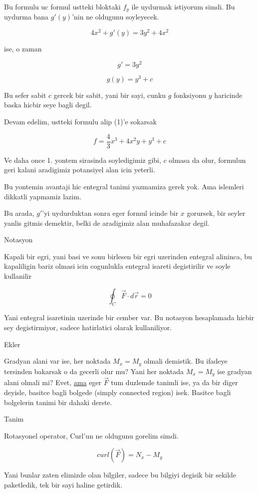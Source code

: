 \documentclass[12pt,fleqn]{article}
\begin{document}
Bu formulu uc formul ustteki bloktaki $f_y$ ile uydurmak istiyorum
simdi. Bu uydurma bana $g'(y)$'nin ne oldugunu soyleyecek. 

\[ 4x^2 + g'(y) = 3y^2 + 4x^2 \]

ise, o zaman

\[ g' = 3y^2 \]

\[ g(y) = y^3 + c \]

Bu sefer sabit $c$ gercek bir sabit, yani bir sayi, cunku $g$ fonksiyonu
$y$ haricinde baska hicbir seye bagli degil. 

Devam edelim, ustteki formulu alip (1)'e sokarsak

\[ f = \frac{4}{3}x^3 + 4x^2y + y^3 + c\]

Ve daha once 1. yontem sirasinda soyledigimiz gibi, $c$ olmasa da olur,
formulun geri kalani aradigimiz potansiyel alan icin yeterli. 

Bu yontemin avantaji hic entegral tanimi yazmamiza gerek yok. Ama islemleri
dikkatli yapmamiz lazim. 

Bu arada, $g'$'yi uydurduktan sonra eger formul icinde bir $x$ gorursek,
bir seyler yanlis gitmis demektir, belki de aradigimiz alan muhafazakar
degil. 

Notasyon 

Kapali bir egri, yani basi ve sonu birlesen bir egri uzerinden entegral
alininca, bu kapaliligin bariz olmasi icin cogunlukla entegral isareti
degistirilir ve soyle kullanilir 

\[ \oint_{C} \vec{F} \cdot d\vec{r} = 0\]

Yani entegral isaretinin uzerinde bir cember var. Bu notasyon hesaplamada
hicbir sey degistirmiyor, sadece hatirlatici olarak kullaniliyor. 

Ekler

Gradyan alani var ise, her noktada $M_x = M_y$ olmali demistik. Bu ifadeye
tersinden bakarsak o da gecerli olur mu? Yani her noktada $M_x = M_y$ ise
gradyan alani olmali mi? Evet, \underline{ama} eger $\vec{F}$ tum duzlemde
tanimli ise, ya da bir diger deyisle, basitce bagli bolgede (simply
connected region) isek. Basitce bagli bolgelerin tanimi bir dahaki derste. 

Tanim

Rotasyonel operator, Curl'un ne oldugunu gorelim simdi. 

\[ curl(\vec{F}) = N_x - M_y \]

Yani bunlar zaten elimizde olan bilgiler, sadece bu bilgiyi degisik bir
sekilde paketledik, tek bir sayi haline getirdik. 
\end{document}
